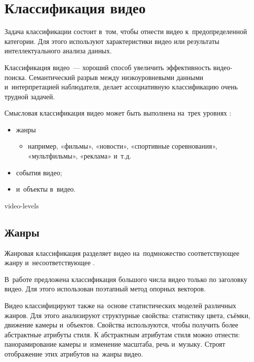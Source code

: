 \section{Классификация видео}

Задача классификации состоит в~том,
чтобы отнести видео к~предопределенной категории.
Для этого используют характеристики видео или
результаты интеллектуального анализа данных.

Классификация видео~— хороший способ увеличить
эффективность видео-поиска.
Семантический разрыв между низкоуровневыми данными
и~интерпретацией наблюдателя, делает ассоциативную классификацию
очень трудной задачей.

Смысловая классификация видео может быть выполнена
на~трех уровнях \cite{Tamizharasan:2013}:
\begin{itemize}
    \item жанры
    \begin{itemize}
        \item например, «фильмы», «новости»,
                «спортивные соревнования», «мультфильмы», «реклама» и~т.д.
    \end{itemize}
    \item события видео;
    \item и~объекты в~видео.
\end{itemize}


\begin{figuredt}
    {video-levels}
\end{figuredt}



\subsection{Жанры}

Жанровая классификация разделяет видео на~подмножество соответствующее жанру
и~несоответствующее \cite{Wu:2012}.

В~работе \cite{Jiang:2007} предложена классификация большого числа
видео только по заголовку видео.
Для этого использован поэтапный метод опорных
векторов.

Видео классифицируют также на~основе статистических моделей различных жанров.
Для этого анализируют структурные свойства:
статистику цвета, съёмки, движение камеры и~объектов.
Свойства используются, чтобы получить более абстрактные атрибуты стиля.
К абстрактным атрибутам стиля можно отнести:
панорамирование камеры и~изменение масштаба, речь и~музыку.
Строят отображение этих атрибутов на~жанры видео.

